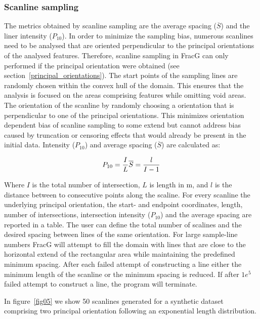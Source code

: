 \documentclass[a4paper,fleqn]{cas-sc}
\begin{document}
\subsubsection{Scanline sampling}
The metrics obtained by scanline sampling are the average spacing ($\overline{S}$) and the liner intensity ($P_{10}$). In order to minimize the sampling bias, numerous scanlines need to be analysed that are oriented perpendicular to the principal orientations of the analysed features. Therefore, scanline sampling in FracG can only performed if the principal orientation were obtained (see section~\ref{principal_orientations}). The start points of the sampling lines are randomly chosen within the convex hull of the domain. This ensures that the analysis is focused on the areas comprising features while omitting void areas. The orientation of the scanline by randomly choosing a orientation that is perpendicular to one of the principal orientations. This minimizes orientation dependent bias of scanline sampling to some extend but cannot address bias caused by truncation or censoring effects that would already be present in the initial data.
Intensity ($P_{10}$) and average spacing ($\overline{S}$) are calculated as:

\begin{equation}
	P_{10} = \frac{I}{L} \\
	\overline{S} = \frac{l}{I-1}
\end{equation}

Where $I$ is the total number of intersection, $L$ is length in m, and $l$ is the distance between to consecutive points along the scaline. For every scanline the underlying principal orientation, the start- and endpoint coordinates, length, number of intersections, intersection intensity ($P_{10}$) and the average spacing are reported in a table. 
The user can define the total number of scalines and the desired spacing between lines of the same orientation. For large sample-line numbers FracG will attempt to fill the domain with lines that are close to the horizontal extend of the rectangular area while maintaining the predefined minimum spacing. After each failed attempt of constructing a line either the minimum length of the scanline or the minimum spacing is reduced. If after $1e^5$ failed attempt to construct a line, the program will terminate.

In figure~\ref{fig05} we show 50 scanlines generated for a synthetic dataset comprising two principal orientation following an exponential length distribution.
\end{document}

